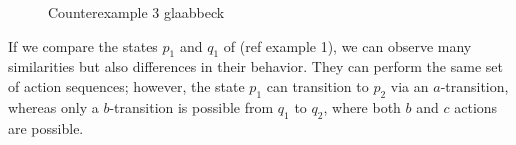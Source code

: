 \begin{isabellebody}
\begin{isamarkuptext}
\begin{figure}[htbp]
\caption{Counterexample 3 glaabbeck}
    \label{fig:2_1}
\end{figure}%
\end{isamarkuptext}\isamarkuptrue%
%
\begin{isamarkuptext}%
If we compare the states $p_1$ and $q_1$ of (ref example 1), we can observe many similarities but also differences in their behavior. 
They can perform the same set of action sequences; however, the state $p_1$ can transition to $p_2$ via an $a$-transition, whereas only a $b$-transition is possible from $q_1$ to $q_2$, where both $b$ and $c$ actions are possible.


\end{isamarkuptext}
\end{isabellebody}
